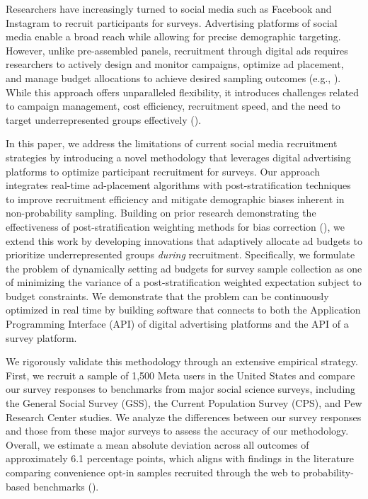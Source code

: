 \documentclass[letterpaper,12pt]{article}
\theoremstyle{proposition}
\begin{document}
Researchers have increasingly turned to social media  such as Facebook and Instagram to recruit participants for surveys. Advertising platforms of social media enable a broad reach while allowing for precise demographic targeting. However, unlike pre-assembled panels, recruitment through digital ads requires researchers to actively design and monitor campaigns, optimize ad placement, and manage budget allocations to achieve desired sampling outcomes (e.g., \citealt{zhang2020quota}). While this approach offers unparalleled flexibility, it introduces challenges related to campaign management, cost efficiency, recruitment speed, and the need to target underrepresented groups effectively (\citealt{donati2024can, aridor2024experiments}).

In this paper, we address the limitations of current social media recruitment strategies by introducing a novel methodology that leverages digital advertising platforms to optimize participant recruitment for surveys. Our approach integrates real-time ad-placement algorithms with post-stratification techniques to improve recruitment efficiency and mitigate demographic biases inherent in non-probability sampling. Building on prior research demonstrating the effectiveness of post-stratification weighting methods for bias correction (\citealt{deville1992calibration,Gelman1997}), we extend this work by developing innovations that adaptively allocate ad budgets to prioritize underrepresented groups \textit{during} recruitment. Specifically, we formulate the problem of dynamically setting ad budgets for survey sample collection as one of minimizing the variance of a post-stratification weighted expectation subject to budget constraints. We demonstrate that the problem can be continuously optimized in real time by building software that connects to both the Application Programming Interface (API) of digital advertising platforms and the API of a survey platform.

We rigorously validate this methodology through an extensive empirical strategy. First, we recruit a sample of 1,500 Meta users in the United States and compare our survey responses to benchmarks from major social science surveys, including the General Social Survey (GSS), the Current Population Survey (CPS), and Pew Research Center studies. We analyze the differences between our survey responses and those from these major surveys to assess the accuracy of our methodology. Overall, we estimate a mean absolute deviation across all outcomes of approximately 6.1 percentage points, which aligns with findings in the literature comparing convenience opt-in samples recruited through the web to probability-based benchmarks (\citealt{goel2015non, mercer2017weighting}).
\end{document}
